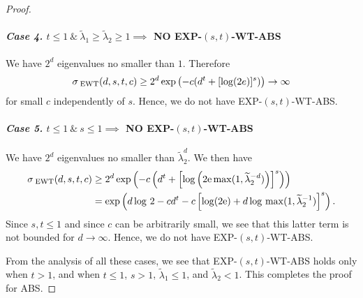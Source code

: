 \documentclass[graybox]{svmult}
\newcommand{\tlambda}{\widetilde{\lambda}}
\newcommand{\me}{\mathrm{e}}
\newcommand{\SEWT}{\sigma_{\;\textup{EWT}}}
\newcommand{\EXP}{\textup{EXP}\xspace}
\newcommand{\ABS}{\textup{ABS}\xspace}
\newcommand{\WT}{\textup{WT}\xspace}
\begin{document}
\begin{proof}
\paragraph{\textit{Case 4.} $t\le 1 \ \&  \ \tlambda_1\ge\tlambda_2\ge1 \implies$ NO \EXP-$(s,t)$-\WT-\ABS }
 We have $2^d$ eigenvalues no smaller than $1$. Therefore
        $$
        \SEWT(d,s,t,c )\ge 2^d\exp\left(-c(d^t+[\log(2e)]^s)\right)
        \to \infty
        $$
        for small $c$ independently of $s$.
        Hence, we do not have \EXP-$(s,t)$-\WT-\ABS.



\paragraph{\textit{Case 5.} $t\le 1 \ \&  \ s \le 1 \implies$ NO \EXP-$(s,t)$-\WT-\ABS} \label{Case111e} 

We have $2^d$ eigenvalues no smaller than $\tlambda_2^d$.
We then have
\begin{align*}
      \SEWT(d,s,t,c) & \ge 2^d
            \exp\left(-c\left(d^t +
            \left[\log\left(2\me \max(1,\tlambda_2^{-d})
            \right)\right]^s\right)\right)\\
      & = 
      \exp\left(d \log \, 2 - cd^t -c\left[\log (2\me) +d\log \, \max(1,\tlambda_2^{-1})\right]^s\right).
\end{align*}
Since $s,t\le 1$ and since $c$ can be arbitrarily small,
we see that this latter term is not bounded for $d\rightarrow\infty$.
        Hence, we do not have \EXP-$(s,t)$-\WT-\ABS.

{}From the analysis of all these cases, we see that
\EXP-$(s,t)$-\WT-\ABS holds only when $t>1$, and
when $t\le 1$, $s>1$,
$\tlambda_1\le1$, and $\tlambda_2<1$. This completes the proof for \ABS.


\end{proof}
\end{document}
